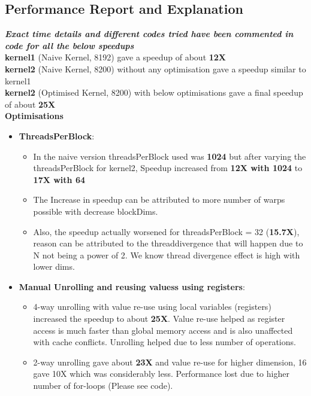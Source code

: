\documentclass[a4paper]{article}
\begin{document}
\subsection{Performance Report and Explanation}
{\bf \emph{Exact time details and different codes tried have been commented in code for all the below speedups}}\\
\newline
{\bf kernel1} (Naive Kernel, 8192) gave a speedup of about {\bf 12X} \\
{\bf kernel2} (Naive Kernel, 8200) without any optimisation gave a speedup similar to kernel1 \\
{\bf kernel2} (Optimised Kernel, 8200) with below optimisations gave a final speedup of about {\bf 25X} \\
\newline
{\bf \large Optimisations}
\begin{itemize}
\item {\bf ThreadsPerBlock}: 
	\begin{itemize}
	\item In the naive version threadsPerBlock used was {\bf 1024} but after varying the threadsPerBlock for
	kernel2, Speedup increased from {\bf 12X with 1024} to {\bf 17X with 64} 
	\item The Increase in speedup can be attributed to more number of warps possible with decrease 
	blockDims.
	\item Also, the speedup actually worsened for threadsPerBlock = 32 ({\bf 15.7X}), reason can be attributed to 
	the threaddivergence that will happen due to N not being a power of 2. We know thread divergence effect is 
	high with lower dims.
	\end{itemize}
\item {\bf Manual Unrolling and reusing valuess using registers}:
	\begin{itemize}
	\item 4-way unrolling with value re-use using local variables (registers) increased the speedup to about 
	{\bf 25X}. Value re-use helped as register access is much faster than global memory access and is also
	unaffected with cache conflicts. Unrolling helped due to less number of operations.
	\item 2-way unrolling gave about {\bf 23X} and value re-use for higher dimension, {16 gave 10X} which was
	considerably less. Performance lost due to higher number of for-loops (Please see code).
	\end{itemize}
\end{itemize}
\end{document}
